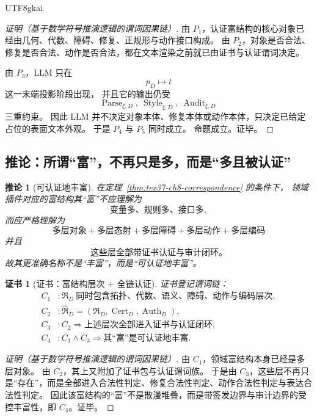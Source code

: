 \documentclass[12pt]{article}
\newtheorem{corollary}{推论}[section]
\newtheorem{Certificate}{证书}[section]
\newcommand{\Parse}{\operatorname{Parse}}
\newcommand{\Audit}{\operatorname{Audit}}
\newcommand{\Cert}{\operatorname{Cert}}
\newcommand{\Auth}{\operatorname{Auth}}
\newcommand{\Style}{\operatorname{Style}}
\begin{document}
\begin{CJK*}{UTF8}{gkai}
\begin{proof}[证明（基于数学符号推演逻辑的谓词因果链）]
由 $P_1$，认证富结构的核心对象已经由几何、代数、障碍、修复、正规形与动作接口构成。
由 $P_2$，对象是否合法、修复是否合法、动作是否合法，都在文本渲染之前就已由证书与认证谓词决定。

由 $P_3$，LLM 只在
\[
  p_D\mapsto t
\]
这一末端投影阶段出现，
并且它的输出仍受
\[
  \Parse_{\xi,D},\ \Style_{\xi,D},\ \Audit_{\xi,D}
\]
三重约束。
因此 LLM 并不决定对象本体、修复本体或动作本体，只决定已给定占位的表面文本外观。
于是 $P_4$ 与 $P_5$ 同时成立。
命题成立。证毕。
\end{proof}

\subsection{推论：所谓“富”，不再只是多，而是“多且被认证”}
\label{subsec:tex37-ch8-corollary-rich}

\begin{corollary}[可认证地丰富]
\label{cor:tex37-ch8-certified-rich}
在定理~\ref{thm:tex37-ch8-correspondence} 的条件下，
领域插件对应的富结构其“富”不应理解为
\[
  \text{变量多、规则多、接口多},
\]
而应严格理解为
\[
  \boxed{
    \text{多层对象}
    +
    \text{多层态射}
    +
    \text{多层障碍}
    +
    \text{多层动作}
    +
    \text{多层编码}
  }
\]
并且
\[
  \boxed{
    \text{这些层全部带证书认证与审计闭环。}
  }
\]
故其更准确名称不是“丰富”，而是“可认证地丰富”。
\end{corollary}

\begin{Certificate}[证书：富结构层次 + 全链认证]
\label{cert:tex37-ch8-certified-rich}
证书登记谓词链：
\[
\begin{aligned}
  C_1 &: \mathfrak R_D\ \text{同时包含拓扑、代数、语义、障碍、动作与编码层次},\\
  C_2 &: \widehat{\mathfrak R}_D=(\mathfrak R_D,\Cert_D,\Auth_D),\\
  C_3 &: C_2\Rightarrow \text{上述层次全部进入证书与认证闭环},\\
  C_4 &: C_1\wedge C_3\Rightarrow \text{其“富”是可认证地丰富}.
\end{aligned}
\]
\end{Certificate}

\begin{proof}[证明（基于数学符号推演逻辑的谓词因果链）]
由 $C_1$，领域富结构本身已经是多层对象。
由 $C_2$，其上又附加了证书包与认证谓词族。
于是由 $C_3$，这些层不再只是“存在”，而是全部进入合法性判定、修复合法性判定、动作合法性判定与表达合法性判定。
因此该富结构的“富”不是散漫堆叠，而是带签发边界与审计边界的受控丰富性，即 $C_4$。证毕。
\end{proof}


\end{CJK*}
\end{document}
